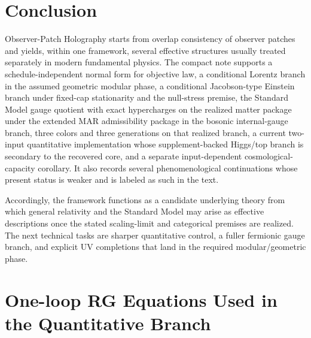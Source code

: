 \documentclass[11pt]{article}
\begin{document}
\section{Conclusion}

Observer-Patch Holography starts from overlap consistency of observer patches and yields, within one framework, several effective structures usually treated separately in modern fundamental physics. The compact note supports a schedule-independent normal form for objective law, a conditional Lorentz branch in the assumed geometric modular phase, a conditional Jacobson-type Einstein branch under fixed-cap stationarity and the null-stress premise, the Standard Model gauge quotient with exact hypercharges on the realized matter package under the extended MAR admissibility package in the bosonic internal-gauge branch, three colors and three generations on that realized branch, a current two-input quantitative implementation whose supplement-backed Higgs/top branch is secondary to the recovered core, and a separate input-dependent cosmological-capacity corollary. It also records several phenomenological continuations whose present status is weaker and is labeled as such in the text.

Accordingly, the framework functions as a candidate underlying theory from which general relativity and the Standard Model may arise as effective descriptions once the stated scaling-limit and categorical premises are realized. The next technical tasks are sharper quantitative control, a fuller fermionic gauge branch, and explicit UV completions that land in the required modular/geometric phase.

\appendix

\section{One-loop RG Equations Used in the Quantitative Branch}\label{app:rges}
\end{document}
